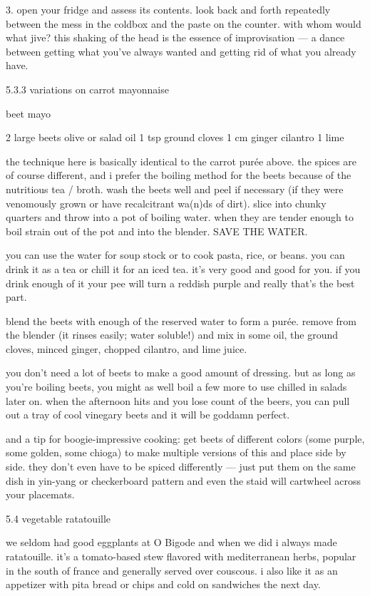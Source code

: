3. open your fridge and assess its contents. look back and forth repeatedly between the mess in the coldbox and the paste on the counter. with whom would what jive? this shaking of the head is the essence of improvisation --- a dance between getting what you've always wanted and getting rid of what you already have.


5.3.3  variations on carrot mayonnaise

beet mayo

2 large beets
olive or salad oil
1 tsp ground cloves
1 cm ginger
cilantro
1 lime

the technique here is basically identical to the carrot pur\'{e}e above. the spices are of course different, and i prefer the boiling method for the beets because of the nutritious tea / broth.
wash the beets well and peel if necessary (if they were venomously grown or have recalcitrant wa(n)ds of dirt). slice into chunky quarters and throw into a pot of boiling water. when they are tender enough to boil strain out of the pot and into the blender. SAVE THE WATER.

you can use the water for soup stock or to cook pasta, rice, or beans. you can drink it as a tea or chill it for an iced tea. it's very good and good for you. if you drink enough of it your pee will turn a reddish purple and really that's the best part.

blend the beets with enough of the reserved water to form a pur\'{e}e. remove from the blender (it rinses easily; water soluble!) and mix in some oil, the ground cloves, minced ginger, chopped cilantro, and lime juice.

you don't need a lot of beets to make a good amount of dressing. but as long as you're boiling beets, you might as well boil a few more to use chilled in salads later on. when the afternoon hits and you lose count of the beers, you can pull out a tray of cool vinegary beets and it will be goddamn perfect.

and a tip for boogie-impressive cooking: get beets of different colors (some purple, some golden, some chioga) to make multiple versions of this and place side by side. they don't even have to be spiced differently --- just put them on the same dish in yin-yang or checkerboard pattern and even the staid will cartwheel across your placemats.


5.4  vegetable ratatouille

we seldom had good eggplants at O Bigode and when we did i always made ratatouille. it's a tomato-based stew flavored with mediterranean herbs, popular in the south of france and generally served over couscous. i also like it as an appetizer with pita bread or chips and cold on sandwiches the next day.

